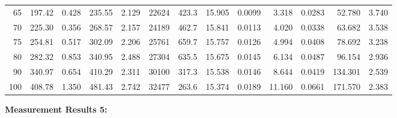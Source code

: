 \documentclass[10pt]{article}
\begin{document}
{\begin{tabular}{|r|rr|rr|rr|rr|rr|r|r|}
       65 &       197.42 &        0.428 &       235.55 &        2.129 &        22624 &        423.3 &       15.905 &       0.0099 &        3.318 &       0.0283 &       52.780 &        3.740 \\
       70 &       225.30 &        0.356 &       268.57 &        2.157 &        24189 &        462.7 &       15.841 &       0.0113 &        4.020 &       0.0338 &       63.682 &        3.538 \\
       75 &       254.81 &        0.517 &       302.09 &        2.206 &        25761 &        659.7 &       15.757 &       0.0126 &        4.994 &       0.0408 &       78.692 &        3.238 \\
       80 &       282.32 &        0.853 &       340.95 &        2.488 &        27304 &        635.5 &       15.675 &       0.0145 &        6.134 &       0.0487 &       96.154 &        2.936 \\
       90 &       340.97 &        0.654 &       410.29 &        2.311 &        30100 &        317.3 &       15.538 &       0.0146 &        8.644 &       0.0419 &      134.301 &        2.539 \\
      100 &       408.78 &        1.350 &       481.43 &        2.742 &        32477 &        263.6 &       15.374 &       0.0189 &       11.160 &       0.0661 &      171.570 &        2.383 \\
\hline
\end{tabular}
}

\vspace{3mm}

\noindent
{\large \bf Measurement Results 5:}
\vspace{3mm}
\end{document}
